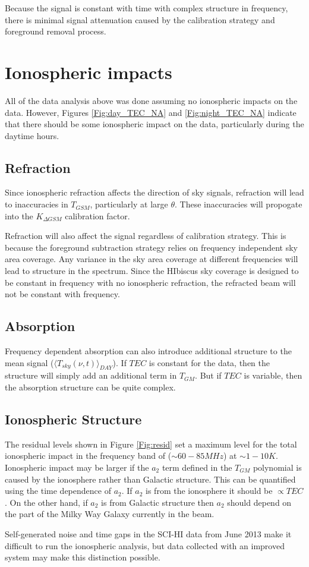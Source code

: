 Because the \cm signal is constant with time with complex structure in frequency, there is minimal signal attenuation caused by the calibration strategy and foreground removal process. 



\section{Ionospheric impacts}

All of the data analysis above was done assuming no ionospheric impacts on the data. However, Figures \ref{Fig:day_TEC_NA} and \ref{Fig:night_TEC_NA} indicate that there should be some ionospheric impact on the data, particularly during the daytime hours. 


\subsection{Refraction} 

Since ionospheric refraction affects the direction of sky signals, refraction will lead to inaccuracies in $T_{GSM}$, particularly at large $\theta$. These inaccuracies will propogate into the $K_{\Delta GSM}$ calibration factor. 

Refraction will also affect the signal regardless of calibration strategy. This is because the foreground subtraction strategy relies on frequency independent sky area coverage. Any variance in the sky area coverage at different frequencies will lead to structure in the spectrum. Since the HIbiscus sky coverage is designed to be constant in frequency with no ionospheric refraction, the refracted beam will not be constant with frequency. 


\subsection{Absorption}

Frequency dependent absorption can also introduce additional structure to the mean signal ($\langle T_{sky}(\nu,t) \rangle_{DAY}$). If $TEC$ is constant for the data, then the structure will simply add an additional term in $T_{GM}$. But if $TEC$ is variable, then the absorption structure can be quite complex. 


\subsection{Ionospheric Structure}

The residual levels shown in Figure \ref{Fig:resid} set a maximum level for the total ionospheric impact in the frequency band of ($\sim 60-85 MHz$) at $\sim 1-10 K$.  Ionospheric impact may be larger if the $a_2$ term defined in the $T_{GM}$ polynomial is caused by the ionosphere rather than Galactic structure. This can be quantified using the time dependence of $a_2$. If $a_2$ is from the ionosphere it should be $\propto TEC$. On the other hand, if $a_2$ is from Galactic structure then $a_2$ should depend on the part of the Milky Way Galaxy currently in the beam. 

Self-generated noise and time gaps in the SCI-HI data from June 2013 make it difficult to run the ionospheric analysis, but data collected with an improved system may make this distinction possible. 
